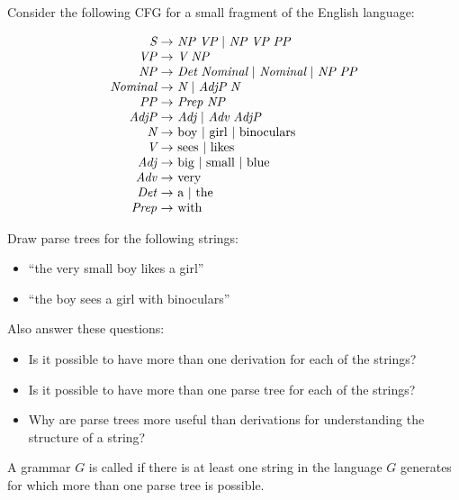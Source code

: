 \documentclass[twoside,letterpaper,openany]{book}
\begin{document}
\begin{exer2}\label{exer:cfgenglish}
Consider the following CFG for a small fragment of the English language:

\[\begin{array}{r@{\ \to\ }l}
\textit{S} & \textit{NP} \ \textit{VP} \ |\  \textit{NP} \ \textit{VP}\ \textit{PP} \\
\textit{VP} & \textit{V}\ \textit{NP} \\
\textit{NP} & \textit{Det}\ \textit{Nominal} \ |\ \textit{Nominal} \ |\ \textit{NP}\ \textit{PP}\\
\textit{Nominal} &  \textit{N}  \ |\ \textit{AdjP}\ \textit{N} \\
\textit{PP} & \textit{Prep}\ \textit{NP} \\
\textit{AdjP} & \textit{Adj} \ |\ \textit{Adv}\ \textit{AdjP} \\
\textit{N} & \textrm{boy} \ |\ \textrm{girl} \ |\ \textrm{binoculars}\\
\textit{V} & \textrm{sees} \ |\ \textrm{likes} \\
\textit{Adj} & \textrm{big} \ |\ \textrm{small} \ |\ \textrm{blue}\\
\textit{Adv} & \textrm{very} \\
\textit{Det} & \textrm{a} \ |\ \textrm{the} \\
\textit{Prep} & \textrm{with}
\end{array}\]

Draw parse trees for the following strings:
\begin{itemize}
\item ``the very small boy likes a girl''
\item ``the boy sees a girl with binoculars''
\end{itemize}

Also answer these questions:
\begin{itemize}
\item Is it possible to have more than one derivation for each of the strings? 
\item Is it possible to have more than one parse tree for each of the strings? 
\item Why are parse trees more useful than derivations for understanding the structure of a string?
\end{itemize}
\end{exer2}

\begin{defn}
A grammar $G$ is called  if there is at least one string in the language $G$ generates for which more than one parse tree is possible.
\end{defn}
\end{document}
